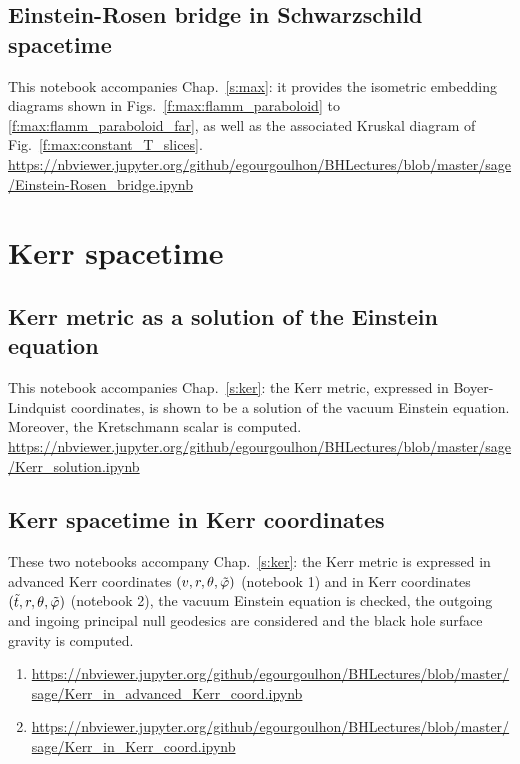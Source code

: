 \subsection{Einstein-Rosen bridge in Schwarzschild spacetime}
\label{s:sam:Einstein-Rosen_bridge}
This notebook accompanies Chap.~\ref{s:max}: it provides the
isometric embedding diagrams shown in Figs.~\ref{f:max:flamm_paraboloid}
to \ref{f:max:flamm_paraboloid_far}, as well as the associated
Kruskal diagram of Fig.~\ref{f:max:constant_T_slices}.\\[1ex]
{\footnotesize
\url{https://nbviewer.jupyter.org/github/egourgoulhon/BHLectures/blob/master/sage/Einstein-Rosen_bridge.ipynb}
}


\section{Kerr spacetime}

\subsection{Kerr metric as a solution of the Einstein equation} \label{s:sam:Kerr_solution}

This notebook accompanies Chap.~\ref{s:ker}: the Kerr metric, expressed in Boyer-Lindquist
coordinates, is shown to be a solution of the vacuum Einstein equation. Moreover, the Kretschmann scalar is computed.\\[1ex]
{\footnotesize
\url{https://nbviewer.jupyter.org/github/egourgoulhon/BHLectures/blob/master/sage/Kerr_solution.ipynb}
}

\subsection{Kerr spacetime in Kerr coordinates} \label{s:sam:Kerr_Kerr_coord}

These two notebooks accompany Chap.~\ref{s:ker}: the Kerr metric is expressed in advanced Kerr coordinates
$(v,r,\theta,{\tilde\varphi})$ (notebook 1) and in Kerr coordinates $({\tilde t},r,\theta,{\tilde\varphi})$ (notebook 2),
the vacuum Einstein equation is checked, the outgoing and ingoing principal null geodesics are considered and the black hole surface gravity is computed.
\begin{enumerate}
\item
{\footnotesize
\url{https://nbviewer.jupyter.org/github/egourgoulhon/BHLectures/blob/master/sage/Kerr_in_advanced_Kerr_coord.ipynb}
}
\item
{\footnotesize
\url{https://nbviewer.jupyter.org/github/egourgoulhon/BHLectures/blob/master/sage/Kerr_in_Kerr_coord.ipynb}
}
\end{enumerate}


